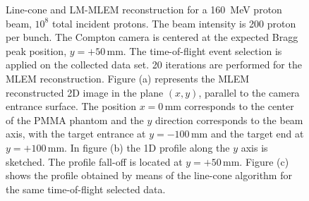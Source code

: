 \begin{figure}
\begin{subfigure}[t]{.49\textwidth}
 \caption{}
 \label{}
\end{subfigure}
\caption{Line-cone and LM-MLEM reconstruction for a 160~MeV proton beam, $10^{8}$ total incident protons. The beam intensity is 200 proton per bunch. The Compton camera is centered at the expected Bragg peak position, $y=+50\,$mm. The time-of-flight event selection is applied on the collected data set. 20 iterations are performed for the MLEM reconstruction.
Figure (a) represents the MLEM reconstructed 2D image in the plane $(x,y)$, parallel to the camera entrance surface. The position $x=0\,$mm corresponds to the center of the PMMA phantom and the $y$ direction corresponds to the beam axis, with the target entrance at $y=-100\,$mm and the target end at $y=+100\,$mm.  In figure (b) the 1D profile along the $y$ axis is sketched. The profile fall-off is located at $y=+50\,$mm. Figure (c) shows the profile obtained by means of the line-cone algorithm for the same time-of-flight selected data.}
\label{chap4::fig::comparison_200pBunch}
\end{figure}

